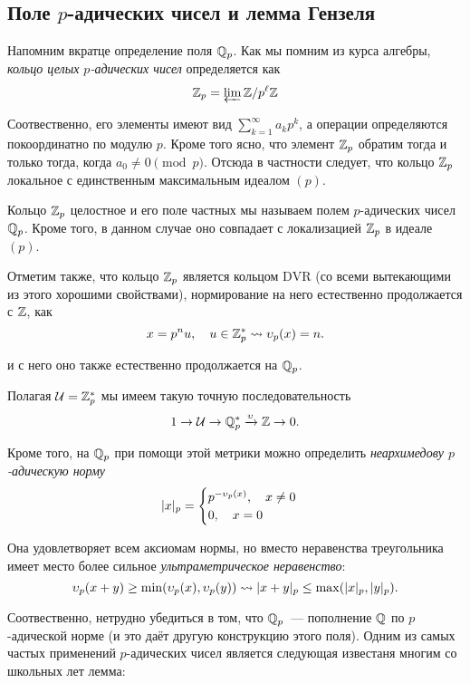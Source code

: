  	\subsection{Поле $p$-адических чисел и лемма Гензеля}

	 Напомним вкратце  определение поля $\mathbb{Q}_{p}$. Как мы помним из курса алгебры,  \emph{кольцо целых $p$-адических чисел} определяется как 
	 \[
	 	\mathbb{Z}_{p} = \varprojlim \mathbb{Z}/p^{\ell}\mathbb{Z}
	 \]

	 Соотвественно, его элементы имеют вид $\sum_{k = 1}^{\infty} a_k p^{k}$, а операции определяются покоординатно по модулю $p$. Кроме того ясно, что элемент $\mathbb{Z}_p$ обратим тогда и только тогда, когда $a_0 \neq 0 \pmod{p}$. Отсюда в частности следует, что кольцо $\mathbb{Z}_{p}$ локальное с единственным максимальным идеалом  $(p)$. 

	 Кольцо $\mathbb{Z}_{p}$ целостное и его поле частных мы называем полем $p$-адических чисел $\mathbb{Q}_{p}$. Кроме того, в данном случае оно совпадает с локализацией $\mathbb{Z}_{p}$ в идеале $(p)$. 

	 Отметим также, что кольцо $\mathbb{Z}_{p}$ является кольцом $\mathrm{DVR}$ (со всеми вытекающими из этого хорошими свойствами), нормирование на него естественно продолжается с $\mathbb{Z}$, как 
	 \[
	 	x = p^n u, \quad u \in \mathbb{Z}_{p}^{*} \rightsquigarrow \upsilon_{p}(x) = n. 
	 \]

	 и с него оно также естественно продолжается на $\mathbb{Q}_{p}$. 

	 Полагая $\mathcal{U} = \mathbb{Z}_{p}^{*}$ мы имеем такую  точную последовательность 
	 \[
	 	1 \to \mathcal{U} \to \mathbb{Q}_{p}^{*} \xrightarrow{\upsilon} \mathbb{Z} \to 0.
	 \]

	 Кроме того, на $\mathbb{Q}_{p}$ при помощи этой метрики можно определить \emph{неархимедову $p$-адическую норму}
	 \[
	 	|x|_{p} = \begin{cases} p^{-\upsilon_{p}(x)}, \quad x \neq 0 \\ 0, \quad x = 0 \end{cases}
	 \]

	 Она удовлетворяет всем аксиомам нормы, но вместо неравенства треугольника имеет место более сильное \emph{ультраметрическое неравенство}: 
	 \[
	 	\upsilon_{p}(x + y) \ge \min(\upsilon_{p}(x), \upsilon_{p}(y)) \rightsquigarrow |x + y|_{p} \le \max(|x|_{p}, |y|_{p}).
	 \]

	 Соотвественно, нетрудно убедиться в том, что $\mathbb{Q}_{p}$~--- пополнение $\mathbb{Q}$ по $p$-адической норме (и это даёт другую конструкцию этого поля). Одним из самых частых применений $p$-адических чисел является следующая известаня многим со школьных лет лемма:    

